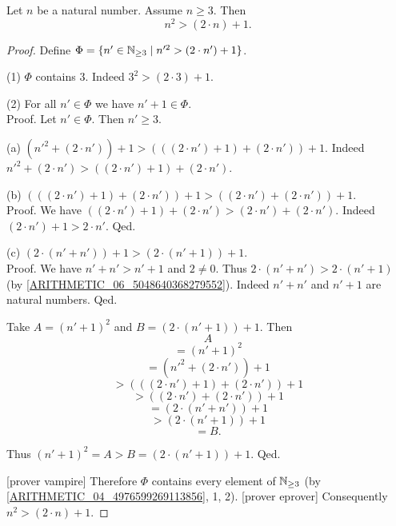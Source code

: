 \documentclass[10pt]{article}
\begin{document}
  \begin{forthel}
    \begin{proposition}
      Let $n$ be a natural number.
      Assume $n \geq 3$.
      Then \[ n^{2} > (2 \cdot n) + 1. \]
    \end{proposition}
    \begin{proof}
      Define $\Phi = \{ n' \in \mathbb{N}_{\geq 3} \mid n'^{2} > (2 \cdot n') + 1 \}$.

      (1) $\Phi$ contains $3$.
      Indeed $3^{2} > (2 \cdot 3) + 1$.

      (2) For all $n' \in \Phi$ we have $n' + 1 \in \Phi$. \\
      Proof.
        Let $n' \in \Phi$.
        Then $n' \geq 3$.

        (a) $(n'^{2} + (2 \cdot n')) + 1
        > (((2 \cdot n') + 1) + (2 \cdot n')) + 1$.
        Indeed $n'^{2} + (2 \cdot n') > ((2 \cdot n') + 1) + (2 \cdot n')$.

        (b) $(((2 \cdot n') + 1) + (2 \cdot n')) + 1
        > ((2 \cdot n') + (2 \cdot n')) + 1$. \\
        Proof.
          We have $((2 \cdot n') + 1) + (2 \cdot n')
          > (2 \cdot n') + (2 \cdot n')$.
          Indeed $(2 \cdot n') + 1 > 2 \cdot n'$.
        Qed.

        (c) $(2 \cdot (n' + n')) + 1 > (2 \cdot (n' + 1)) + 1$. \\
        Proof.
          We have $n' + n' > n' + 1$ and $2 \neq 0$.
          Thus $2 \cdot (n' + n') > 2 \cdot (n' + 1)$ (by \cref{ARITHMETIC_06_5048640368279552}).
          Indeed $n' + n'$ and $n' + 1$ are natural numbers.
        Qed.

        Take $A = (n' + 1)^{2}$ and $B = (2 \cdot (n' + 1)) + 1$. %
        Then
        \[  A                                             \]
        \[    = (n' + 1)^{2}                              \]
        \[    = (n'^{2} + (2 \cdot n')) + 1               \]
        \[    > (((2 \cdot n') + 1) + (2 \cdot n')) + 1   \]  %
        \[    > ((2 \cdot n') + (2 \cdot n')) + 1         \]  %
        \[    = (2 \cdot (n' + n')) + 1                   \]
        \[    > (2 \cdot (n' + 1)) + 1                    \]  %
        \[    = B.                                        \]

        Thus $(n' + 1)^{2} = A > B = (2 \cdot (n' + 1)) + 1$.
      Qed.

      [prover vampire]
      Therefore $\Phi$ contains every element of $\mathbb{N}_{\geq 3}$ (by \cref{ARITHMETIC_04_4976599269113856}, 1, 2).
      [prover eprover]
      Consequently $n^{2} > (2 \cdot n) + 1$.
    \end{proof}
  \end{forthel}
\end{document}
